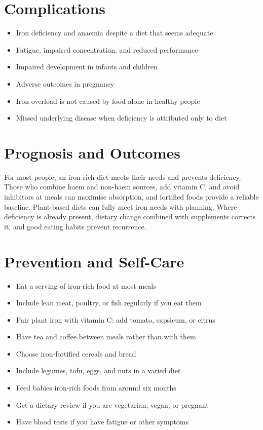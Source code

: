 \section*{Complications}
\begin{itemize}
    \item Iron deficiency and anaemia despite a diet that seems adequate
    \item Fatigue, impaired concentration, and reduced performance
    \item Impaired development in infants and children
    \item Adverse outcomes in pregnancy
    \item Iron overload is not caused by food alone in healthy people
    \item Missed underlying disease when deficiency is attributed only to diet
\end{itemize}

\section*{Prognosis and Outcomes}
For most people, an iron-rich diet meets their needs and prevents deficiency. Those who combine haem and non-haem sources, add vitamin C, and avoid inhibitors at meals can maximise absorption, and fortified foods provide a reliable baseline. Plant-based diets can fully meet iron needs with planning. Where deficiency is already present, dietary change combined with supplements corrects it, and good eating habits prevent recurrence.

\section*{Prevention and Self-Care}
\begin{itemize}
    \item Eat a serving of iron-rich food at most meals
    \item Include lean meat, poultry, or fish regularly if you eat them
    \item Pair plant iron with vitamin C: add tomato, capsicum, or citrus
    \item Have tea and coffee between meals rather than with them
    \item Choose iron-fortified cereals and bread
    \item Include legumes, tofu, eggs, and nuts in a varied diet
    \item Feed babies iron-rich foods from around six months
    \item Get a dietary review if you are vegetarian, vegan, or pregnant
    \item Have blood tests if you have fatigue or other symptoms
\end{itemize}

